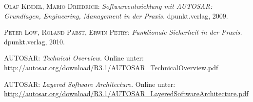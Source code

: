 \documentclass[]{beamer}
\begin{document}
\begin{frame}


\begin{thebibliography}{10}

 \textsc{Olaf Kindel, Mario Driedrich}: {\em Softwareentwicklung mit AUTOSAR: Grundlagen, Engineering, Management in der Praxis.} dpunkt.verlag, 2009.

 \textsc{Peter Löw, Roland Pabst, Erwin Petry}: {\em Funktionale Sicherheit in der Praxis.} dpunkt.verlag, 2010.

 \textsc{AUTOSAR}: {\em Technical Overview.} Online unter: \url{http://autosar.org/download/R3.1/AUTOSAR_TechnicalOverview.pdf}

 \textsc{AUTOSAR}: {\em Layered Software Architecture.} Online unter: \url{http://autosar.org/download/R3.1/AUTOSAR_LayeredSoftwareArchitecture.pdf}

\end{thebibliography}


\end{frame}
\end{document}

